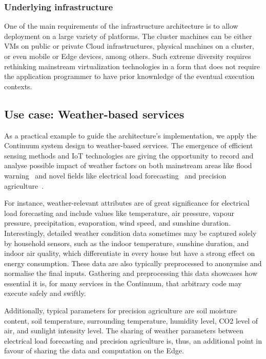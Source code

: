 \subsubsection{Underlying infrastructure}

One of the main requirements of the infrastructure architecture is to allow deployment on a large variety of platforms. The cluster machines can be either VMs on public or private Cloud infrastructures, physical machines on a cluster, or even mobile or Edge devices, among others. Such extreme diversity requires rethinking mainstream virtualization technologies in a form that does not require the application programmer to have prior knownledge of the eventual execution contexts.

\subsection{Use case: Weather-based services}\label{sec:uc}

As a practical example to guide the architecture's implementation, we apply the Continuum system design to weather-based services. The emergence of efficient sensing methods and IoT technologies are giving the opportunity to record and analyse possible impact of weather factors on both mainstream areas like flood warning~\cite{brzoza2016embedded} and novel fields like electrical load forecasting~\cite{weather-load-forecasting} and precision agriculture~\cite{keswani2019adapting}.

For instance, weather-relevant attributes are of great significance for electrical load forecasting and include values like temperature, air pressure, vapour pressure, precipitation, evaporation, wind speed, and sunshine duration. Interestingly, detailed weather condition data sometimes may be captured solely by household sensors, such as the indoor temperature, sunshine duration, and indoor air quality, which differentiate in every house but have a strong effect on energy consumption. These data are also typically preprocessed to anonymise and normalise the final inputs. Gathering and preprocessing this data showcases how essential it is, for many services in the Continuum, that arbitrary code may execute safely and swiftly.

Additionally, typical parameters for precision agriculture are soil moisture content, soil temperature, surrounding temperature, humidity level, CO2 level of air, and sunlight intensity level. The sharing of weather parameters between electrical load forecasting and precision agriculture is, thus, an additional point in favour of sharing the data and computation on the Edge.

